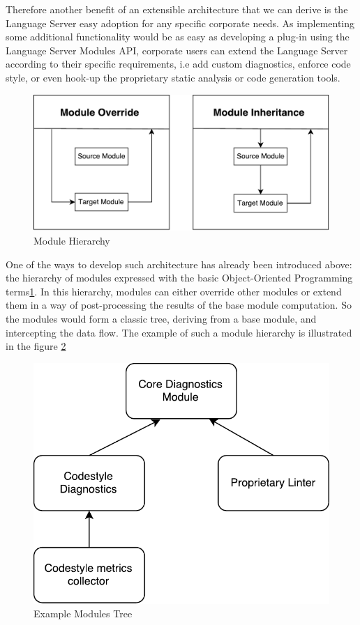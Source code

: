 Therefore another benefit of an extensible architecture that we can derive is the
Language Server easy adoption for any specific corporate needs.
As implementing some additional functionality would be as easy as developing a plug-in using
the Language Server Modules API, corporate users can extend the Language Server
according to their specific requirements, i.e add custom diagnostics, enforce code style,
or even hook-up the proprietary static analysis or code generation tools.

\begin{figure}[H]
    \centering
    \includegraphics[width=.7\textwidth]{figs/module_hierarchy.pdf}
    \caption{Module Hierarchy}
    \label{fig:met:module_hierarchy}
\end{figure}

One of the ways to develop such architecture has already been introduced above: the hierarchy of modules expressed with the basic Object-Oriented Programming terms\ref{fig:met:module_hierarchy}.
In this hierarchy, modules can either override other modules or extend them in a way of post-processing the
results of the base module computation. So the modules would form a classic tree, deriving from a base module,
and intercepting the data flow. The example of such a module hierarchy is illustrated in the figure \ref{fig:met:module_tree}

\begin{figure}[H]
    \centering
    \includegraphics[width=.5\textwidth]{figs/module_tree.pdf}
    \caption{Example Modules Tree}
    \label{fig:met:module_tree}
\end{figure}


